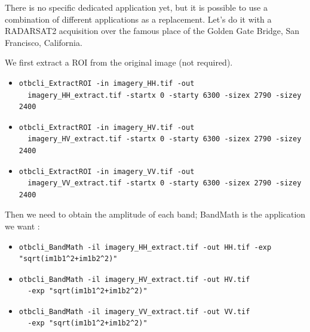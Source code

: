 There is no specific dedicated application yet, but it is possible to use a combination of different applications as a replacement.
Let's do it with a RADARSAT2 acquisition over the famous place of the Golden Gate Bridge, San Francisco, California.

We first extract a ROI from the original image (not required). 


\begin{itemize}
\item 
\begin{verbatim} 
otbcli_ExtractROI -in imagery_HH.tif -out
  imagery_HH_extract.tif -startx 0 -starty 6300 -sizex 2790 -sizey 2400 
\end{verbatim}
									  
\item 
\begin{verbatim} 
otbcli_ExtractROI -in imagery_HV.tif -out
  imagery_HV_extract.tif -startx 0 -starty 6300 -sizex 2790 -sizey 2400 
\end{verbatim}
									  
\item 
\begin{verbatim} 
otbcli_ExtractROI -in imagery_VV.tif -out
  imagery_VV_extract.tif -startx 0 -starty 6300 -sizex 2790 -sizey 2400 
\end{verbatim}
\end{itemize}

Then we need to obtain the amplitude of each band; BandMath is the application we want :

\begin{itemize}
\item 
\begin{verbatim} 
otbcli_BandMath -il imagery_HH_extract.tif -out HH.tif -exp
"sqrt(im1b1^2+im1b2^2)" 
\end{verbatim}
									  
\item 
\begin{verbatim} 
otbcli_BandMath -il imagery_HV_extract.tif -out HV.tif
  -exp "sqrt(im1b1^2+im1b2^2)" 
\end{verbatim}
									  
\item 
\begin{verbatim} 
otbcli_BandMath -il imagery_VV_extract.tif -out VV.tif
  -exp "sqrt(im1b1^2+im1b2^2)" 
\end{verbatim}
\end{itemize}

